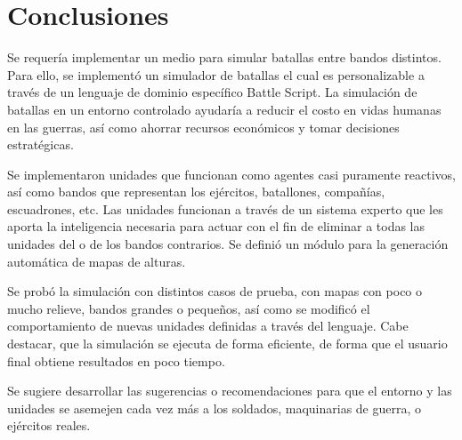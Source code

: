 
\section{Conclusiones}

Se requería implementar un medio para simular batallas entre bandos distintos. Para ello, se implementó un simulador de batallas el cual es personalizable a través de un lenguaje de dominio específico Battle Script. La simulación de batallas en un entorno controlado ayudaría a reducir el costo en vidas humanas en las guerras, así como ahorrar recursos económicos y tomar decisiones estratégicas.

Se implementaron unidades que funcionan como agentes casi puramente reactivos, así como bandos que representan los ejércitos, batallones, compañías, escuadrones, etc. Las unidades funcionan a través de un sistema experto que les aporta la inteligencia necesaria para actuar con el fin de eliminar a todas las unidades del o de los bandos contrarios.  Se definió un módulo para la generación automática de mapas de alturas.

Se probó la simulación con distintos casos de prueba, con mapas con poco o mucho relieve, bandos grandes o pequeños, así como se modificó el comportamiento de nuevas unidades definidas a través del lenguaje. Cabe destacar, que la simulación se ejecuta de forma eficiente, de forma que el usuario final obtiene resultados en poco tiempo.

Se sugiere desarrollar las sugerencias o recomendaciones para que el entorno y las unidades se asemejen cada vez más a los soldados, maquinarias de guerra, o ejércitos reales.